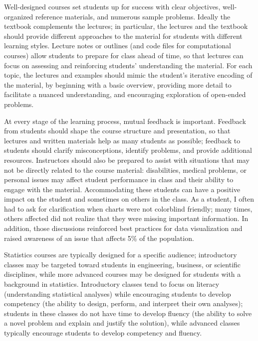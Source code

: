 \documentclass[12pt, letterpaper, sans]{moderncv}
\begin{document}
Well-designed courses set students up for success with clear objectives, well-organized reference materials, and numerous sample problems. Ideally the textbook complements the lectures; in particular, the lectures and the textbook should provide different approaches to the material for students with different learning styles. Lecture notes or outlines (and code files for computational courses) allow students to prepare for class ahead of time, so that lectures can focus on assessing and reinforcing students' understanding the material. For each topic, the lectures and examples should mimic the student's iterative encoding of the material, by beginning with a basic overview, providing more detail to facilitate a nuanced understanding, and encouraging exploration of open-ended problems.  

At every stage of the learning process, mutual feedback is important. Feedback from students should shape the course structure and presentation, so that lectures and written materials help as many students as possible; feedback to students should clarify misconceptions, identify problems, and provide additional resources. Instructors should also be prepared to assist with situations that may not be directly related to the course material: disabilities, medical problems, or personal issues may affect student performance in class and their ability to engage with the material. Accommodating these students can have a positive impact on the student and sometimes on others in the class. As a student, I often had to ask for clarification when charts were not colorblind friendly; many times, others affected did not realize that they were missing important information. In addition, those discussions reinforced best practices for data visualization and raised  awareness of an issue that affects 5\% of the population. 

Statistics courses are typically designed for a specific audience; introductory classes may be targeted toward students in engineering, business, or scientific disciplines, while more advanced courses may be designed for students with a background in statistics. Introductory classes tend to focus on literacy (understanding statistical analyses) while encouraging students to develop competency (the ability to design, perform, and interpret their own analyses); students in these classes do not have time to develop fluency (the ability to solve a novel problem and explain and justify the solution), while advanced classes typically encourage students to develop competency and fluency.
\end{document}
